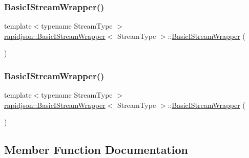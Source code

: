 \subsubsection{\texorpdfstring{BasicIStreamWrapper()}{BasicIStreamWrapper()}\hspace{0.1cm}{\footnotesize\ttfamily [3/4]}}
{\footnotesize\ttfamily template$<$typename Stream\+Type $>$ \\
\mbox{\hyperlink{classrapidjson_1_1_basic_i_stream_wrapper}{rapidjson\+::\+Basic\+I\+Stream\+Wrapper}}$<$ Stream\+Type $>$\+::\mbox{\hyperlink{classrapidjson_1_1_basic_i_stream_wrapper}{Basic\+I\+Stream\+Wrapper}} (\begin{DoxyParamCaption}{ }\end{DoxyParamCaption})\hspace{0.3cm}{\ttfamily [private]}}

\mbox{\label{classrapidjson_1_1_basic_i_stream_wrapper_a0736c7200a15d6887d5b3b9abef91caf}} 
\subsubsection{\texorpdfstring{BasicIStreamWrapper()}{BasicIStreamWrapper()}\hspace{0.1cm}{\footnotesize\ttfamily [4/4]}}
{\footnotesize\ttfamily template$<$typename Stream\+Type $>$ \\
\mbox{\hyperlink{classrapidjson_1_1_basic_i_stream_wrapper}{rapidjson\+::\+Basic\+I\+Stream\+Wrapper}}$<$ Stream\+Type $>$\+::\mbox{\hyperlink{classrapidjson_1_1_basic_i_stream_wrapper}{Basic\+I\+Stream\+Wrapper}} (\begin{DoxyParamCaption}\item[{const \mbox{\hyperlink{classrapidjson_1_1_basic_i_stream_wrapper}{Basic\+I\+Stream\+Wrapper}}$<$ Stream\+Type $>$ \&}]{ }\end{DoxyParamCaption})\hspace{0.3cm}{\ttfamily [private]}}



\subsection{Member Function Documentation}
\mbox{\label{classrapidjson_1_1_basic_i_stream_wrapper_ab787ec1bce9ec0e4ddc42cde173d3ab1}} 
